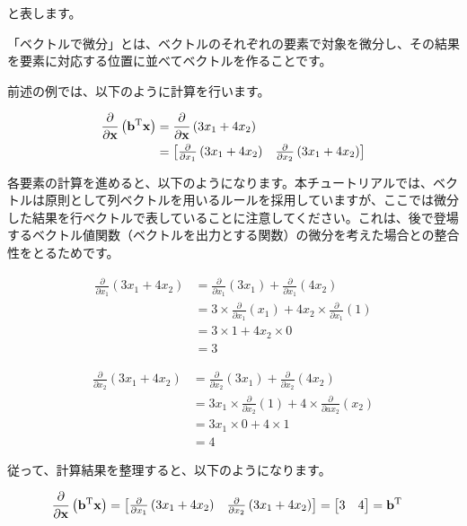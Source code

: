 と表します。

「ベクトルで微分」とは、ベクトルのそれぞれの要素で対象を微分し、その結果を要素に対応する位置に並べてベクトルを作ることです。

前述の例では、以下のように計算を行います。


\[
\begin{aligned}
\frac{\partial}{\partial {\bf x}} \left( {\bf b}^{\rm T} {\bf x} \right)
&= \frac{\partial}{\partial {\bf x}} \left( 3x_1 + 4x_2 \right) \\
&=
\begin{bmatrix}
\frac{\partial}{\partial x_1} \left( 3x_1 + 4x_2 \right) & \frac{\partial}{\partial x_2} \left( 3x_1 + 4x_2 \right)
\end{bmatrix}
\end{aligned}
\]


各要素の計算を進めると、以下のようになります。本チュートリアルでは、ベクトルは原則として列ベクトルを用いるルールを採用していますが、ここでは微分した結果を行ベクトルで表していることに注意してください。これは、後で登場するベクトル値関数（ベクトルを出力とする関数）の微分を考えた場合との整合性をとるためです。


\[
\begin{aligned}
\frac{\partial}{\partial x_1} \left( 3x_1 + 4x_2 \right)
&= \frac{\partial}{\partial x_1} \left( 3x_1 \right)
+ \frac{\partial}{\partial x_1} \left( 4x_2 \right) \\
&= 3 \times \frac{\partial}{\partial x_1} \left( x_1 \right)
+ 4x_{2} \times \frac{\partial}{\partial x_1} (1) \\
&= 3 \times 1 + 4x_{2} \times 0 \\
&= 3
\end{aligned}
\]


\[
\begin{aligned}
\frac{\partial}{\partial x_2} \left( 3x_1 + 4x_2 \right)
&= \frac{\partial}{\partial x_2} \left( 3x_1 \right)
+ \frac{\partial}{\partial x_2} \left( 4x_2 \right) \\
&= 3x_{1} \times \frac{\partial}{\partial x_2} (1)
+ 4 \times \frac{\partial}{\partial ax_2} (x_{2}) \\
&= 3x_{1} \times 0 + 4 \times 1 \\
&= 4
\end{aligned}
\]


従って、計算結果を整理すると、以下のようになります。


\[
\begin{aligned}
\frac{\partial}{\partial {\bf x}} \left( {\bf b}^{\rm T}{\bf x} \right)
&=
\begin{bmatrix}
\frac{\partial}{\partial x_1} \left( 3x_1 + 4x_2 \right) & \frac{\partial}{\partial x_2} \left( 3x_1 + 4x_2\right)
\end{bmatrix}
=
\begin{bmatrix}
3 & 4
\end{bmatrix}
=
{\bf b}^{\rm T}
\end{aligned}
\]


